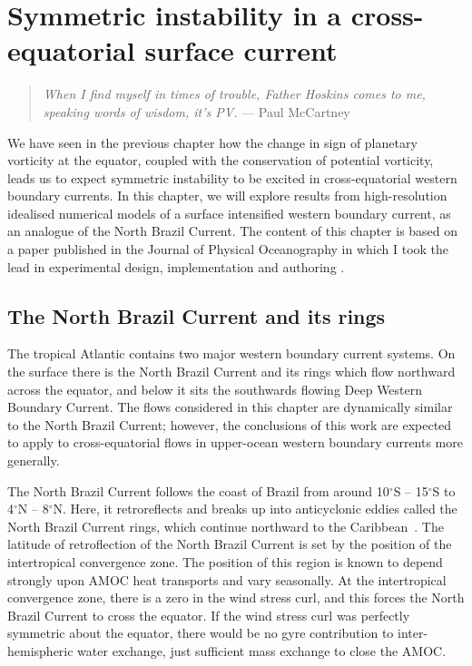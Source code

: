 \chapter{Symmetric instability in a cross-equatorial surface current}
\label{chap:3}
\begin{quote}
    \textit{When I find myself in times of trouble, Father Hoskins comes to me, speaking words of wisdom, it's PV.} --- Paul McCartney
\end{quote}

We have seen in the previous chapter how the change in sign of planetary vorticity at the equator, coupled with the conservation of potential vorticity, leads us to expect symmetric instability to be excited in cross-equatorial western boundary currents. In this chapter, we will explore results from high-resolution idealised numerical models of a surface intensified western boundary current, as an analogue of the North Brazil Current. The content of this chapter is based on a paper published in the Journal of Physical Oceanography in which I took the lead in experimental design, implementation and authoring \citep{Goldsworth2021a}.

\section{The North Brazil Current and its rings}
The tropical Atlantic contains two major western boundary current systems. On the surface there is the North Brazil Current and its rings which flow northward across the equator, and below it sits the southwards flowing Deep Western Boundary Current. The flows considered in this chapter are dynamically similar to the North Brazil Current; however, the conclusions of this work are expected to apply to cross-equatorial flows in upper-ocean western boundary currents more generally.

The North Brazil Current follows the coast of Brazil from around 10$^\circ$S -- 15$^\circ$S to 4$^\circ$N -- 8$^\circ$N. Here, it retroreflects and breaks up into anticyclonic eddies called the North Brazil Current rings, which continue northward to the Caribbean~\citep{Talley2011AtlOce, Fonseca2004}. The latitude of retroflection of the North Brazil Current is set by the position of the intertropical convergence zone. The position of this region is known to depend strongly upon AMOC heat transports and vary seasonally. At the intertropical convergence zone, there is a zero in the wind stress curl, and this forces the North Brazil Current to cross the equator. If the wind stress curl was perfectly symmetric about the equator, there would be no gyre contribution to inter-hemispheric water exchange, just sufficient mass exchange to close the AMOC.

